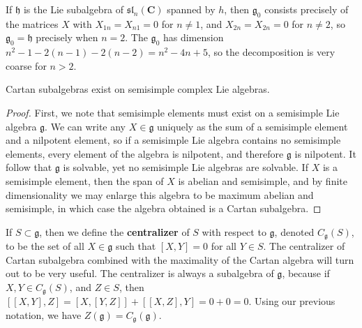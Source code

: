 \begin{example}
    If $\mathfrak{h}$ is the Lie subalgebra of $\mathfrak{sl}_n(\mathbf{C})$ spanned by $h$, then $\mathfrak{g}_0$ consists precisely of the matrices $X$ with $X_{1n} = X_{n1} = 0$ for $n \neq 1$, and $X_{2n} = X_{2n} = 0$ for $n \neq 2$, so $\mathfrak{g}_0 = \mathfrak{h}$ precisely when $n = 2$. The $\mathfrak{g}_0$ has dimension $n^2 - 1 - 2(n-1) - 2(n-2) = n^2 - 4n + 5$, so the decomposition is very coarse for $n > 2$.
\end{example}

\begin{theorem}
    Cartan subalgebras exist on semisimple complex Lie algebras.
\end{theorem}
\begin{proof}
    First, we note that semisimple elements must exist on a semisimple Lie algebra $\mathfrak{g}$. We can write any $X \in \mathfrak{g}$ uniquely as the sum of a semisimple element and a nilpotent element, so if a semisimple Lie algebra contains no semisimple elements, every element of the algebra is nilpotent, and therefore $\mathfrak{g}$ is nilpotent. It follow that $\mathfrak{g}$ is solvable, yet no semisimple Lie algebras are solvable. If $X$ is a semisimple element, then the span of $X$ is abelian and semisimple, and by finite dimensionality we may enlarge this algebra to be maximum abelian and semisimple, in which case the algebra obtained is a Cartan subalgebra.
\end{proof}

If $S \subset \mathfrak{g}$, then we define the {\bf centralizer} of $S$ with respect to $\mathfrak{g}$, denoted $C_\mathfrak{g}(S)$, to be the set of all $X \in \mathfrak{g}$ such that $[X,Y] = 0$ for all $Y \in S$. The centralizer of Cartan subalgebra combined with the maximality of the Cartan algebra will turn out to be very useful. The centralizer is always a subalgebra of $\mathfrak{g}$, because if $X,Y \in C_\mathfrak{g}(S)$, and $Z \in S$, then $[[X,Y],Z] = [X,[Y,Z]] + [[X,Z],Y] = 0 + 0 = 0$. Using our previous notation, we have $Z(\mathfrak{g}) = C_\mathfrak{g}(\mathfrak{g})$.

